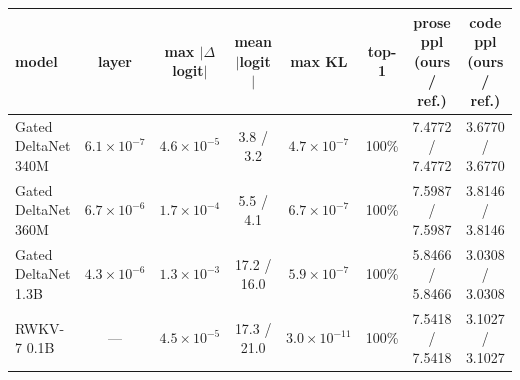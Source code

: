 \begin{tabular}{lccccccc}
\toprule
model & layer & max $|\Delta$logit$|$ & mean $|$logit$|$ & max KL & top-1 & prose ppl (ours / ref.) & code ppl (ours / ref.) \\
\midrule
Gated DeltaNet 340M & $6.1\times10^{-7}$ & $4.6\times10^{-5}$ & 3.8 / 3.2 & $4.7\times10^{-7}$ & 100\% & 7.4772 / 7.4772 & 3.6770 / 3.6770 \\
Gated DeltaNet 360M & $6.7\times10^{-6}$ & $1.7\times10^{-4}$ & 5.5 / 4.1 & $6.7\times10^{-7}$ & 100\% & 7.5987 / 7.5987 & 3.8146 / 3.8146 \\
Gated DeltaNet 1.3B & $4.3\times10^{-6}$ & $1.3\times10^{-3}$ & 17.2 / 16.0 & $5.9\times10^{-7}$ & 100\% & 5.8466 / 5.8466 & 3.0308 / 3.0308 \\
RWKV-7 0.1B & --- & $4.5\times10^{-5}$ & 17.3 / 21.0 & $3.0\times10^{-11}$ & 100\% & 7.5418 / 7.5418 & 3.1027 / 3.1027 \\
\bottomrule
\end{tabular}
